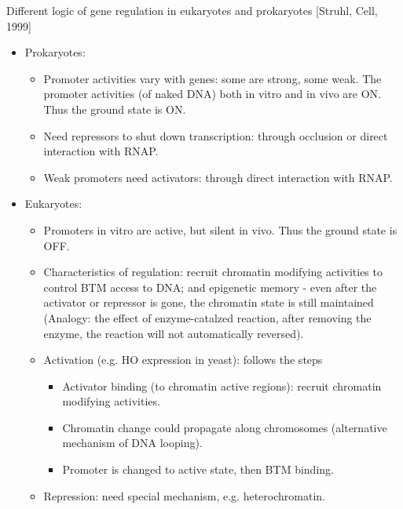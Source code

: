 \documentclass{report}
\begin{document}
Different logic of gene regulation in eukaryotes and prokaryotes [Struhl, Cell, 1999]
\begin{itemize}
	\item Prokaryotes:
	\begin{itemize}
		
		\item Promoter activities vary with genes: some are strong, some weak. The promoter activities (of naked DNA) both in vitro and in vivo are ON. Thus the ground state is ON. 
		
		\item Need repressors to shut down transcription: through occlusion or direct interaction with RNAP. 
		
		\item Weak promoters need activators: through direct interaction with RNAP. 
		
	\end{itemize}
	
	\item Eukaryotes:
	\begin{itemize}
		
		\item Promoters in vitro are active, but silent in vivo. Thus the ground state is OFF. 
		
		\item Characteristics of regulation: recruit chromatin modifying activities to control BTM access to DNA; and epigenetic memory - even after the activator or repressor is gone, the chromatin state is still maintained (Analogy: the effect of enzyme-catalzed reaction, after removing the enzyme, the reaction will not automatically reversed). 
		
		\item Activation (e.g. HO expression in yeast): follows the steps
		\begin{itemize}
			\item Activator binding (to chromatin active regions): recruit chromatin modifying activities. 
			\item Chromatin change could propagate along chromosomes (alternative mechanism of DNA looping). 
			\item Promoter is changed to active state, then BTM binding. 
		\end{itemize}
		
		\item Repression: need special mechanism, e.g. heterochromatin. 
		
	\end{itemize}
\end{itemize}
\end{document}
